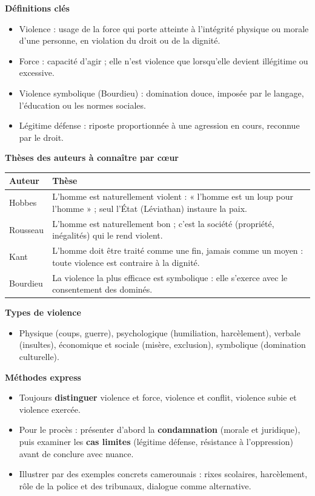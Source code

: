 \documentclass[11pt]{article}
\newcommand{\cle}[1]{{\popxbold\color{popdark}#1}}
\begin{document}
\begin{bilan}
\textbf{Définitions clés}
\begin{itemize}
\item \cle{Violence} : usage de la force qui porte atteinte à l'intégrité physique ou morale d'une personne, en violation du droit ou de la dignité.
\item \cle{Force} : capacité d'agir ; elle n'est violence que lorsqu'elle devient illégitime ou excessive.
\item \cle{Violence symbolique} (Bourdieu) : domination douce, imposée par le langage, l'éducation ou les normes sociales.
\item \cle{Légitime défense} : riposte proportionnée à une agression en cours, reconnue par le droit.
\end{itemize}

\textbf{Thèses des auteurs à connaître par cœur}
\begin{center}
\begin{tabularx}{\linewidth}{|l|X|}\hline
\rowcolor{popblueL} \textbf{Auteur} & \textbf{Thèse} \\ \hline
Hobbes & L'homme est naturellement violent : « l'homme est un loup pour l'homme » ; seul l'État (Léviathan) instaure la paix. \\ \hline
Rousseau & L'homme est naturellement bon ; c'est la société (propriété, inégalités) qui le rend violent. \\ \hline
Kant & L'homme doit être traité comme une fin, jamais comme un moyen : toute violence est contraire à la dignité. \\ \hline
Bourdieu & La violence la plus efficace est symbolique : elle s'exerce avec le consentement des dominés. \\ \hline
\end{tabularx}
\end{center}

\textbf{Types de violence}
\begin{itemize}
\item Physique (coups, guerre), psychologique (humiliation, harcèlement), verbale (insultes), économique et sociale (misère, exclusion), symbolique (domination culturelle).
\end{itemize}

\textbf{Méthodes express}
\begin{itemize}
\item Toujours \textbf{distinguer} violence et force, violence et conflit, violence subie et violence exercée.
\item Pour le procès : présenter d'abord la \textbf{condamnation} (morale et juridique), puis examiner les \textbf{cas limites} (légitime défense, résistance à l'oppression) avant de conclure avec nuance.
\item Illustrer par des exemples concrets camerounais : rixes scolaires, harcèlement, rôle de la police et des tribunaux, dialogue comme alternative.
\end{itemize}
\end{bilan}
\end{document}
